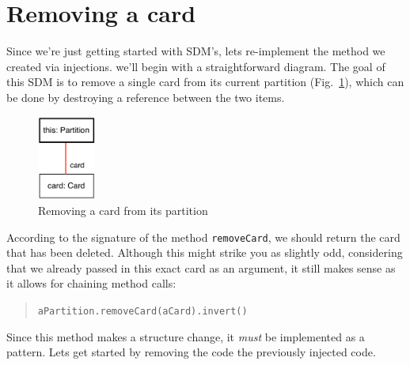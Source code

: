 \newpage
\genHeader
\section{Removing a card}
\hypertarget{sec:remCard}{}

Since we're just getting started with SDM's, lets re-implement the method we created via injections. we'll begin with a straightforward diagram. The goal of
this SDM is to remove a single card from its current partition (Fig.~\ref{fig:goal_removeCard}), which can be done by destroying a reference between the two
items.
\vspace{0.5cm}

\begin{figure}[htbp]
	\centering
    \includegraphics[width=0.17\textwidth]{removeCard.pdf}
	\caption{Removing a card from its partition}
	\label{fig:goal_removeCard}
\end{figure}
\FloatBarrier

\vspace{0.5cm}

According to the signature of the method \texttt{removeCard}, we should return the card that has been deleted. Although this might strike you as slightly odd,
considering that we already passed in this exact card as an argument, it still makes sense as it allows for chaining method calls:
\begin{quote}\texttt{aPartition.removeCard(aCard).invert()}\end{quote}

Since this method makes a structure change, it \emph{must} be implemented as a pattern. Lets get started by removing the code the previously injected code.

